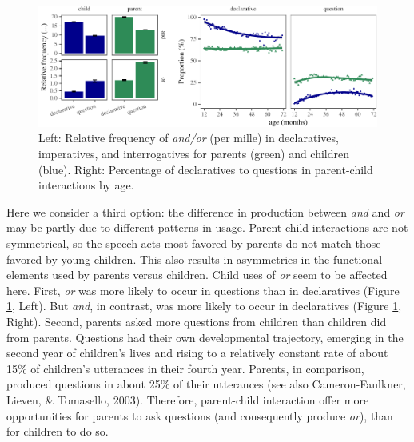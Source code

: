 \documentclass[
  english,
  ,man,floatsintext]{apa6}
\begin{document}
\begin{figure}[H]

{\centering \includegraphics{figs/speechActPlots-1} 

}

\caption{Left: Relative frequency of \textit{and/or} (per mille) in declaratives, imperatives, and interrogatives for parents (green) and children (blue). Right: Percentage of declaratives to questions in parent-child interactions by age.}\label{fig:speechActPlots}
\end{figure}

Here we consider a third option: the difference in production between \emph{and} and \emph{or} may be partly due to different patterns in usage. Parent-child interactions are not symmetrical, so the speech acts most favored by parents do not match those favored by young children. This also results in asymmetries in the functional elements used by parents versus children. Child uses of \emph{or} seem to be affected here. First, \emph{or} was more likely to occur in questions than in declaratives (Figure \ref{fig:speechActPlots}, Left). But \emph{and}, in contrast, was more likely to occur in declaratives (Figure \ref{fig:speechActPlots}, Right). Second, parents asked more questions from children than children did from parents. Questions had their own developmental trajectory, emerging in the second year of children's lives and rising to a relatively constant rate of about 15\% of children's utterances in their fourth year. Parents, in comparison, produced questions in about 25\% of their utterances (see also Cameron-Faulkner, Lieven, \& Tomasello, 2003). Therefore, parent-child interaction offer more opportunities for parents to ask questions (and consequently produce \emph{or}), than for children to do so.
\end{document}
